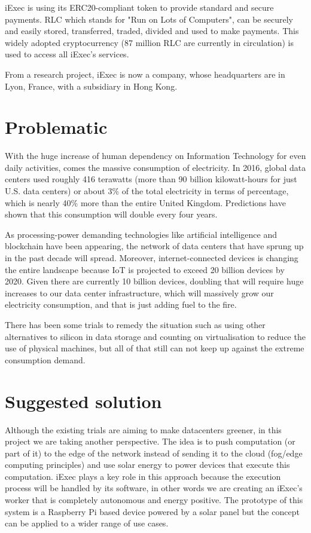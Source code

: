   iExec is using its ERC20-compliant token to provide standard and secure payments. RLC\cite{RLC} which stands for
  "Run on Lots of Computers", can be securely and easily stored, transferred, traded, divided and used
  to make payments. This widely adopted cryptocurrency (87 million RLC are currently in circulation)
  is used to access all iExec's services.

  From a research project, iExec is now a company, whose headquarters are in Lyon, France, with a
  subsidiary in Hong Kong.

\section{Problematic}
  With the huge increase of human dependency on Information Technology for even daily activities,
  comes the massive consumption of electricity. In 2016, global data centers used roughly 416
  terawatts (more than 90 billion kilowatt-hours for just U.S. data centers) or about 3\% of the
  total electricity in terms of percentage, which is nearly 40\% more than the entire United Kingdom.
  Predictions have shown that this consumption will double every four years\cite{consumption-prediction}.

  As processing-power demanding technologies like artificial intelligence and blockchain have
  been appearing, the network of data centers that have sprung up in the past decade will spread.
  Moreover, internet-connected devices is changing the entire landscape because IoT is
  projected to exceed 20 billion devices by 2020. Given there are currently 10 billion devices,
  doubling that will require huge increases to our data center infrastructure, which will
  massively grow our electricity consumption, and that is just adding fuel to the fire.

  There has been some trials to remedy the situation such as using other alternatives to silicon in
  data storage and counting on virtualisation to reduce the use of physical machines, but all of that
  still can not keep up against the extreme consumption demand.

\section{Suggested solution}
  Although the existing trials are aiming to make datacenters greener, in this project we are taking another
  perspective. The idea is to push computation (or part of it) to the edge of the network instead of sending
  it to the cloud (fog/edge computing principles) and use solar energy to power devices that execute this
  computation. iExec plays a key role in this approach because the execution process will be handled by its
  software, in other words we are creating an iExec's worker that is completely autonomous and energy positive.
  The prototype of this system is a Raspberry Pi based device powered by a solar panel but the concept can be
  applied to a wider range of use cases.

